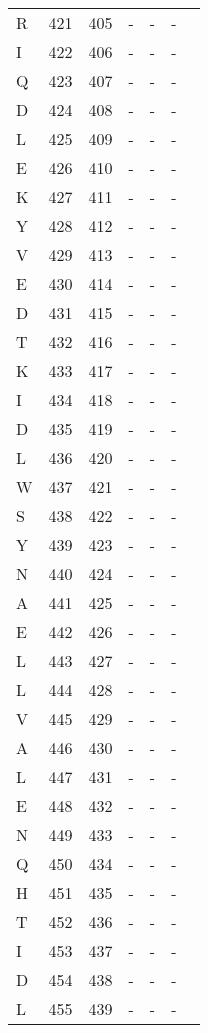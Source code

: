 \documentclass[10pt]{article}
\begin{document}
\begin{longtable}{lllllll}
  R & 421 & 405 & - & - & - &  \\ 
  I & 422 & 406 & - & - & - &  \\ 
  Q & 423 & 407 & - & - & - &  \\ 
  D & 424 & 408 & - & - & - &  \\ 
  L & 425 & 409 & - & - & - &  \\ 
  E & 426 & 410 & - & - & - &  \\ 
  K & 427 & 411 & - & - & - &  \\ 
  Y & 428 & 412 & - & - & - &  \\ 
  V & 429 & 413 & - & - & - &  \\ 
  E & 430 & 414 & - & - & - &  \\ 
  D & 431 & 415 & - & - & - &  \\ 
  T & 432 & 416 & - & - & - &  \\ 
  K & 433 & 417 & - & - & - &  \\ 
  I & 434 & 418 & - & - & - &  \\ 
  D & 435 & 419 & - & - & - &  \\ 
  L & 436 & 420 & - & - & - &  \\ 
  W & 437 & 421 & - & - & - &  \\ 
  S & 438 & 422 & - & - & - &  \\ 
  Y & 439 & 423 & - & - & - &  \\ 
  N & 440 & 424 & - & - & - &  \\ 
  A & 441 & 425 & - & - & - &  \\ 
  E & 442 & 426 & - & - & - &  \\ 
  L & 443 & 427 & - & - & - &  \\ 
  L & 444 & 428 & - & - & - &  \\ 
  V & 445 & 429 & - & - & - &  \\ 
  A & 446 & 430 & - & - & - &  \\ 
  L & 447 & 431 & - & - & - &  \\ 
  E & 448 & 432 & - & - & - &  \\ 
  N & 449 & 433 & - & - & - &  \\ 
  Q & 450 & 434 & - & - & - &  \\ 
  H & 451 & 435 & - & - & - &  \\ 
  T & 452 & 436 & - & - & - &  \\ 
  I & 453 & 437 & - & - & - &  \\ 
  D & 454 & 438 & - & - & - &  \\ 
  L & 455 & 439 & - & - & - &  \\ 

\end{longtable}
\end{document}

